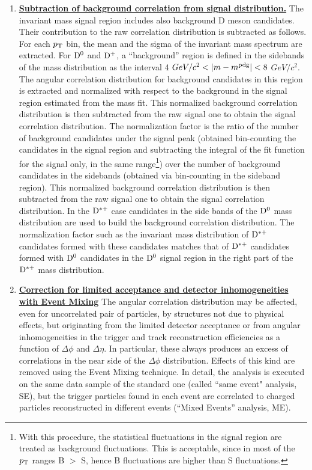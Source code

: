 \begin{enumerate}
\item
\underline {\bf Subtraction of background correlation from signal distribution.}
The invariant mass signal region includes also background D meson candidates. Their contribution to the
raw correlation distribution is subtracted as follows. For each $p_{\rm T}$ bin, the mean and the sigma of the
invariant mass spectrum are extracted. For ${\rm D^0}$ and ${\rm D^+}$, a ``background'' region is defined in the sidebands of the mass
distribution as the interval 4 $GeV/c ^{2}<|m-m^{\rm pdg}|<8$ $GeV/c^{2}$. The angular correlation distribution
for background candidates in this region is extracted and normalized with respect to the background in the signal region
estimated from the mass fit. This normalized background correlation distribution is then subtracted from the
raw signal one to obtain the signal correlation distribution. The normalization factor is the ratio of the number of background candidates under the signal peak (obtained bin-counting the candidates in the signal region and subtracting the integral of the fit function for the signal only, in the same range\footnote{With this procedure, the statistical fluctuations in the signal region are treated as background fluctuations. This is acceptable, since in most of the $p_{\rm T}$ ranges B $>$ S, hence B fluctuations are higher than S fluctuations.}) over the number of background candidates in the sidebands (obtained via bin-counting in the sideband region). This normalized background correlation distribution is then subtracted from the
raw signal one to obtain the signal correlation distribution. In the ${\rm D^{*+}}$ case candidates in the side bands
of the ${\rm D^0}$ mass distribution are used to build the background correlation distribution. The normalization factor such
as the invariant mass distribution of ${\rm D^{*+}}$ candidates formed with these candidates matches that of ${\rm D^{*+}}$ candidates
formed with ${\rm D^0}$ candidates in the ${\rm D^0}$ signal region in the right part of the ${\rm D^{*+}}$ mass distribution.

\item
\underline {\bf Correction for limited acceptance and detector inhomogeneities with Event Mixing}
The angular correlation distribution may be affected, even for uncorrelated pair of particles, by structures not due to physical effects, but originating from the limited detector acceptance or from angular inhomogeneities in the trigger and track reconstruction efficiencies as a function of $\Delta\phi$ and $\Delta\eta$.
In particular, these always produces an excess of correlations in the near side of the $\Delta\phi$ distribution. Effects of this kind are removed using the Event Mixing technique. 
In detail, the analysis is executed on the same data sample of the standard one (called ``same event" analysis, SE), but the trigger particles found in each event are correlated to charged particles reconstructed in different events (``Mixed Events'' analysis, ME). \\


\end{enumerate}
